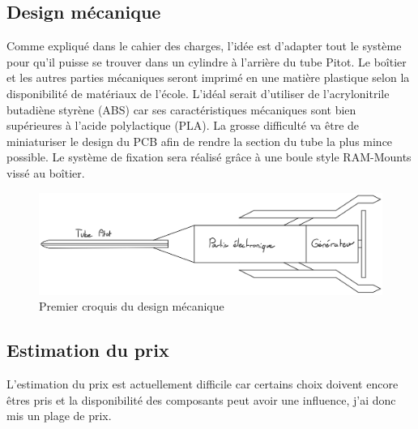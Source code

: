 \subsection{Design mécanique}
    Comme expliqué dans le cahier des charges, l'idée est d'adapter tout le système pour qu'il puisse se trouver dans un cylindre à l'arrière du tube Pitot. Le boîtier et les autres parties mécaniques seront imprimé en une matière plastique selon la disponibilité de matériaux de l'école. L'idéal serait d'utiliser de l'acrylonitrile butadiène styrène (ABS) car ses caractéristiques mécaniques sont bien supérieures à l'acide polylactique (PLA). La grosse difficulté va être de miniaturiser le design du PCB afin de rendre la section du tube la plus mince possible. Le système de fixation sera réalisé grâce à une boule style RAM-Mounts vissé au boîtier. 
    
    \begin{figure}[h]
        \caption{Premier croquis du design mécanique}
        \centering
        \includegraphics[width=15cm]{Images/CroquisMecanique.png}
    \end{figure}
    \newpage
    
\subsection{Estimation du prix}
    L'estimation du prix est actuellement difficile car certains choix doivent encore êtres pris et la disponibilité des composants peut avoir une influence, j'ai donc mis un plage de prix.

